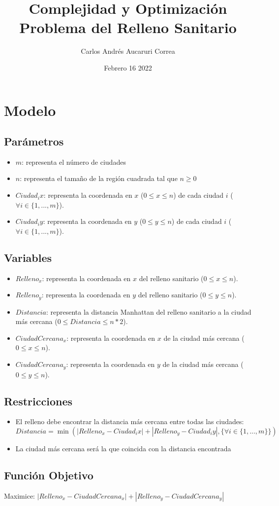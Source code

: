 \documentclass{article}
\title{Complejidad y Optimización \\
Problema del Relleno Sanitario}
\author{Carlos Andrés Aucaruri Correa}
\date{Febrero 16 2022}
\begin{document}
\maketitle

\pagebreak

\tableofcontents

\pagebreak

\section{Modelo}

\subsection{Parámetros}
\begin{itemize}
    \item $m$: representa el número de ciudades
    \item $n$: representa el tamaño de la región cuadrada tal que $n \geq 0$
    \item $Ciudad_ix$: representa la coordenada en $x$ ($0 \leq x \leq n$) de cada ciudad $i$ ($\forall i \in \{1,...,m\}$).
    \item $Ciudad_iy$: representa la coordenada en $y$ ($0 \leq y \leq n$) de cada ciudad $i$ ($\forall i \in \{1,...,m\}$).
\end{itemize}

\subsection{Variables}
\begin{itemize}
    \item $Relleno_x$: representa la coordenada en $x$ del relleno sanitario ($0 \leq x \leq n$).
    \item $Relleno_y$: representa la coordenada en $y$ del relleno sanitario ($0 \leq y \leq n$).
    \item $Distancia$: representa la distancia Manhattan del relleno sanitario a la ciudad más cercana ($0 \leq Distancia \leq n*2$).
    \item $CiudadCercana_x$: representa la coordenada en $x$ de la ciudad más cercana ($0 \leq x \leq n$).
    \item $CiudadCercana_y$: representa la coordenada en $y$ de la ciudad más cercana ($0 \leq y \leq n$).
\end{itemize}

\subsection{Restricciones}
\begin{itemize}
    \item El relleno debe encontrar la distancia más cercana entre todas las ciudades:
    $Distancia = \min( |Relleno_x - Ciudad_ix| + |Relleno_y - Ciudad_iy|, \{ \forall i \in \{1,...,m\} \})$
    \item La ciudad más cercana será la que coincida con la distancia encontrada
\end{itemize}

\subsection{Función Objetivo}
Maximice: $|Relleno_x - CiudadCercana_x| + |Relleno_y - CiudadCercana_y|$
\end{document}
